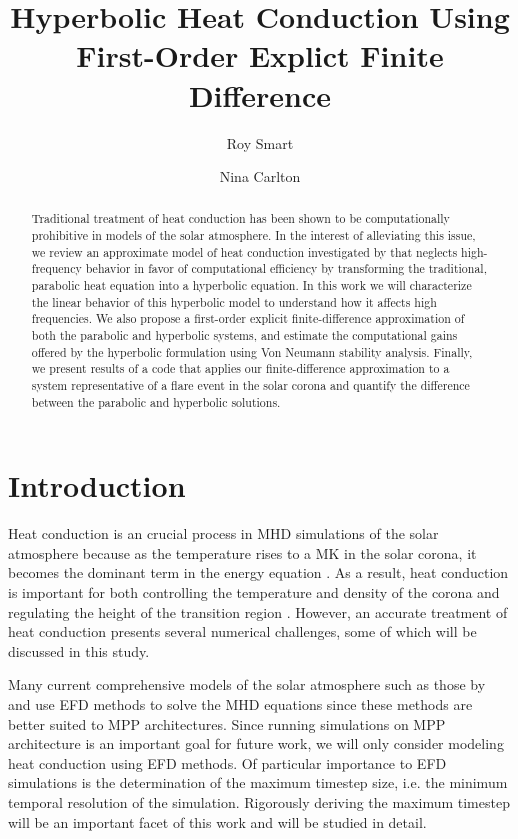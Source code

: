 \documentclass[iop]{emulateapj}
\begin{document}
	
	
	\title{Hyperbolic Heat Conduction Using First-Order Explict Finite Difference}
	\author{Roy Smart}
	\author{Nina Carlton}
	
	\begin{abstract}
		Traditional treatment of heat conduction has been shown to be computationally prohibitive in models of the solar atmosphere.
			In the interest of alleviating this issue, we review an approximate model of heat conduction investigated by \cite{A} that neglects high-frequency behavior in favor of computational efficiency by transforming the traditional, parabolic heat equation into a hyperbolic equation. In this work we will characterize the linear behavior of this hyperbolic model to understand how it affects high frequencies. We also propose a first-order explicit finite-difference approximation of both the parabolic and hyperbolic systems, and estimate the computational gains offered by the hyperbolic formulation using Von Neumann stability analysis. Finally, we present results of a code that applies our finite-difference approximation to a system representative of a flare event in the solar corona and quantify the difference between the parabolic and hyperbolic solutions.
			
	\end{abstract}
	
	\section{Introduction}
	
		\noindent
		Heat conduction is an crucial process in \ac{MHD} simulations of the solar atmosphere because as the temperature rises to a MK in the solar corona, it becomes the dominant term in the energy equation \citep{gudiksen_11}.
			As a result, heat conduction is important for both controlling the temperature and density of the corona and regulating the height of the transition region \citep{bingert_11}.
			However, an accurate treatment of heat conduction presents several numerical challenges, some of which will be discussed in this study.
			
		Many current comprehensive models of the solar atmosphere such as those by \cite{gudiksen_05} and \cite{A} use \ac{EFD} methods to solve the \ac{MHD} equations since these methods are better suited to \ac{MPP} architectures.
			Since running simulations on \ac{MPP} architecture is an important goal for future work, we will only consider modeling heat conduction using \ac{EFD} methods.
			Of particular importance to \ac{EFD} simulations is the determination of the maximum timestep size, i.e. the minimum temporal resolution of the simulation.
			Rigorously deriving the maximum timestep will be an important facet of this work and will be studied in detail.
		
\end{document}

